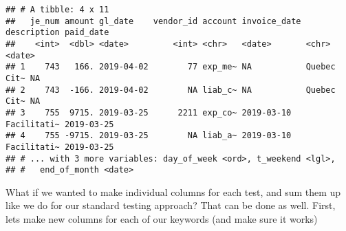 \documentclass[
]{book}
\newenvironment{Shaded}{\begin{snugshade}}{\end{snugshade}}
\newcommand{\DataTypeTok}[1]{\textcolor[rgb]{0.13,0.29,0.53}{#1}}
\newcommand{\KeywordTok}[1]{\textcolor[rgb]{0.13,0.29,0.53}{\textbf{#1}}}
\newcommand{\NormalTok}[1]{#1}
\newcommand{\OperatorTok}[1]{\textcolor[rgb]{0.81,0.36,0.00}{\textbf{#1}}}
\newcommand{\OtherTok}[1]{\textcolor[rgb]{0.56,0.35,0.01}{#1}}
\newcommand{\StringTok}[1]{\textcolor[rgb]{0.31,0.60,0.02}{#1}}
\begin{document}
\begin{verbatim}
## # A tibble: 4 x 11
##   je_num amount gl_date    vendor_id account invoice_date description paid_date 
##    <int>  <dbl> <date>         <int> <chr>   <date>       <chr>       <date>    
## 1    743   166. 2019-04-02        77 exp_me~ NA           Quebec Cit~ NA        
## 2    743  -166. 2019-04-02        NA liab_c~ NA           Quebec Cit~ NA        
## 3    755  9715. 2019-03-25      2211 exp_co~ 2019-03-10   Facilitati~ 2019-03-25
## 4    755 -9715. 2019-03-25        NA liab_a~ 2019-03-10   Facilitati~ 2019-03-25
## # ... with 3 more variables: day_of_week <ord>, t_weekend <lgl>,
## #   end_of_month <date>
\end{verbatim}

What if we wanted to make individual columns for each test, and sum them up like we do for our standard testing approach? That can be done as well. First, lets make new columns for each of our keywords (and make sure it works)

\begin{Shaded}
\end{Shaded}
\end{document}

